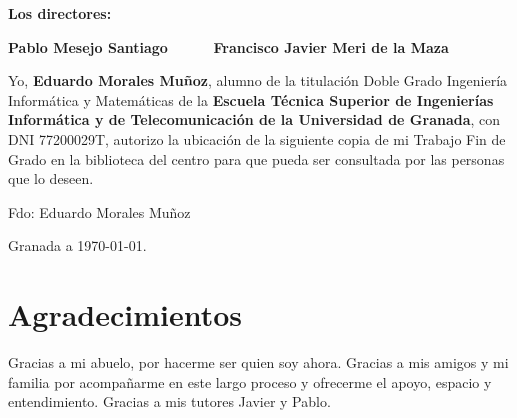 \vspace{1cm}

\textbf{Los directores:}

\vspace{5cm}

\noindent \textbf{Pablo Mesejo Santiago \ \ \ \ \ Francisco Javier Meri de la Maza}


\newpage


Yo, \textbf{Eduardo Morales Muñoz}, alumno de la titulación Doble Grado Ingeniería Informática y Matemáticas de la \textbf{Escuela Técnica Superior de Ingenierías Informática y de Telecomunicación de la Universidad de Granada}, con DNI 77200029T, autorizo la ubicación de la siguiente copia de mi Trabajo Fin de Grado en la biblioteca del centro para que pueda ser
consultada por las personas que lo deseen.

\vspace{6cm}

\noindent Fdo: Eduardo Morales Muñoz

\vspace{2cm}

\begin{flushright}
Granada a \today.
\end{flushright}



\newpage





\section*{Agradecimientos}

       \vspace{1cm}


Gracias a mi abuelo, por hacerme ser quien soy ahora. Gracias a mis amigos y mi familia por acompañarme en este largo proceso y ofrecerme el apoyo, espacio y entendimiento. Gracias a mis tutores Javier y Pablo.

